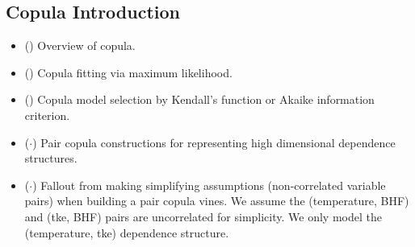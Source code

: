 
\subsection{Copula Introduction}

\begin{itemize}
    \item (\checkmark) Overview of copula.
    \item (\checkmark) Copula fitting via maximum likelihood.
    \item (\checkmark) Copula model selection by Kendall's function or Akaike information criterion.
    \item ($\cdot$) Pair copula constructions for representing high dimensional dependence structures.
    \item ($\cdot$) Fallout from making simplifying assumptions (non-correlated variable pairs) when building
          a pair copula vines.  We assume the (temperature, BHF) and (tke, BHF) pairs are uncorrelated for simplicity.
          We only model the (temperature, tke) dependence structure.
\end{itemize}
